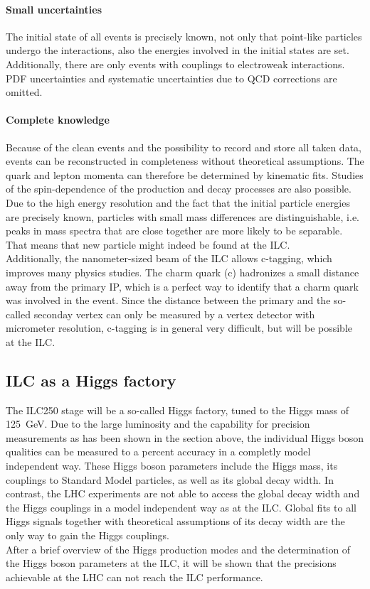 \paragraph{Small uncertainties}
The initial state of all events is precisely known, not only that point-like particles undergo the interactions, also the energies involved in the initial states are set.
Additionally, there are only events with couplings to electroweak interactions.\\
PDF uncertainties and systematic uncertainties due to QCD corrections are omitted.

\paragraph{Complete knowledge}
Because of the clean events and the possibility to record and store all taken data, events can be reconstructed in completeness without theoretical assumptions.
The quark and lepton momenta can therefore be determined by kinematic fits.
Studies of the spin-dependence of the production and decay processes are also possible.\\
Due to the high energy resolution and the fact that the initial particle energies are precisely known, particles with small mass differences are distinguishable, i.e. peaks in mass spectra that are close together are more likely to be separable.
That means that new particle might indeed be found at the ILC.\\
Additionally, the nanometer-sized beam of the ILC allows c-tagging, which improves many physics studies.
The charm quark (c) hadronizes a small distance away from the primary IP, which is a perfect way to identify that a charm quark was involved in the event.
Since the distance between the primary and the so-called seconday vertex can only be measured by a vertex detector with micrometer resolution, c-tagging is in general very difficult, but will be possible at the ILC.

\subsection{ILC as a Higgs factory}
The ILC250 stage will be a so-called Higgs factory, tuned to the Higgs mass of \SI{125}{\GeV}.
Due to the large luminosity and the capability for precision measurements as has been shown in the section above, the individual Higgs boson qualities can be measured to a percent accuracy in a completly model independent way.
These Higgs boson parameters include the Higgs mass, its couplings to Standard Model particles, as well as its global decay width.
In contrast, the LHC experiments are not able to access the global decay width and the Higgs couplings in a model independent way as at the ILC.
Global fits to all Higgs signals together with theoretical assumptions of its decay width are the only way to gain the Higgs couplings.
\\After a brief overview of the Higgs production modes and the determination of the Higgs boson parameters at the ILC, it will be shown that the precisions achievable at the LHC can not reach the ILC performance.

